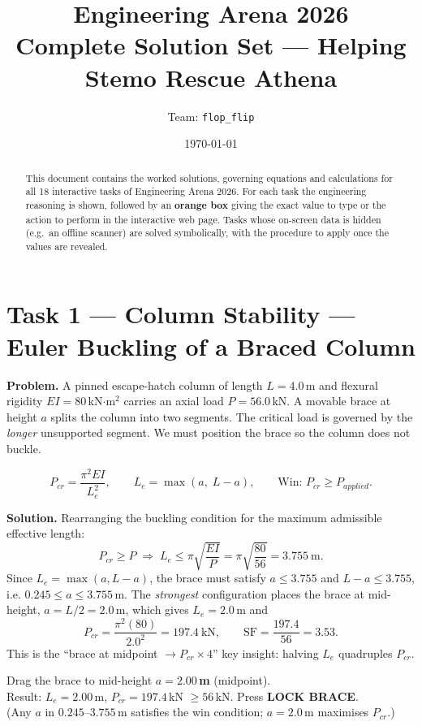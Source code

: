 \documentclass[11pt]{article}
\title{\textbf{Engineering Arena 2026}\\[4pt]
\large Complete Solution Set --- Helping Stemo Rescue Athena}
\author{Team: \texttt{flop\_flip}}
\date{\today}
\newcommand{\task}[2]{\section{Task #1 --- #2}}
\begin{document}
\maketitle

\begin{abstract}
\noindent This document contains the worked solutions, governing equations and
calculations for all 18 interactive tasks of Engineering Arena 2026. For each
task the engineering reasoning is shown, followed by an \textbf{orange box}
giving the exact value to type or the action to perform in the interactive
web page. Tasks whose on-screen data is hidden (e.g.\ an offline scanner) are
solved symbolically, with the procedure to apply once the values are revealed.
\end{abstract}

\tableofcontents
\newpage

\task{1}{Column Stability --- Euler Buckling of a Braced Column}
\textbf{Problem.} A pinned escape-hatch column of length $L=4.0$\,m and
flexural rigidity $EI=80$\,kN$\cdot$m$^2$ carries an axial load
$P=56.0$\,kN. A movable brace at height $a$ splits the column into two
segments. The critical load is governed by the \emph{longer} unsupported
segment. We must position the brace so the column does not buckle.

\begin{relbox}
\[
P_{cr}=\frac{\pi^2 EI}{L_e^{2}},\qquad
L_e=\max(a,\;L-a),\qquad
\text{Win: } P_{cr}\ge P_{applied}.
\]
\end{relbox}

\textbf{Solution.} Rearranging the buckling condition for the maximum
admissible effective length:
\[
P_{cr}\ge P \;\Longrightarrow\;
L_e\le \pi\sqrt{\frac{EI}{P}}
      =\pi\sqrt{\frac{80}{56}}=3.755\ \text{m}.
\]
Since $L_e=\max(a,L-a)$, the brace must satisfy
$a\le 3.755$ and $L-a\le 3.755$, i.e. $0.245\le a\le 3.755$\,m.
The \emph{strongest} configuration places the brace at mid-height,
$a=L/2=2.0$\,m, which gives $L_e=2.0$\,m and
\[
P_{cr}=\frac{\pi^2(80)}{2.0^{2}}=197.4\ \text{kN},
\qquad
\text{SF}=\frac{197.4}{56}=3.53 .
\]
This is the ``brace at midpoint $\rightarrow P_{cr}\times 4$'' key insight:
halving $L_e$ quadruples $P_{cr}$.

\begin{answer}
Drag the brace to mid-height \textbf{$a = 2.00$\,m} (midpoint).\\
Result: $L_e = 2.00$\,m, $P_{cr}=197.4$\,kN $\ge 56$\,kN. Press \textbf{LOCK BRACE}.\\
(Any $a$ in $0.245$--$3.755$\,m satisfies the win condition; $a=2.0$\,m maximises $P_{cr}$.)
\end{answer}
\end{document}
